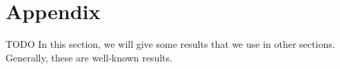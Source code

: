 \newpage
\section{Appendix}

TODO
In this section, we will give some results that we use in other sections. Generally, these are well-known results.